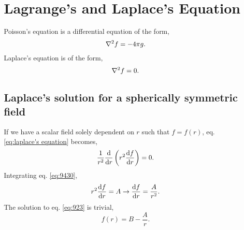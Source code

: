 \documentclass{book}
\begin{document}
\section{Lagrange's and Laplace's Equation}
Poisson's equation is a differential equation of the form,
\begin{equation}
	\laplacian{f} = -4\pi g. \label{eq:poisson's equation}
\end{equation}
Laplace's equation is of the form,
\begin{equation}
	\laplacian{f} = 0. \label{eq:laplace's equation}
\end{equation}
\subsection{Laplace's solution for a spherically symmetric field}
If we have a scalar field solely dependent on $r$ such that $f = f(r)$, eq. \eqref{eq:laplace's equation} becomes,
\begin{equation}
	\frac{1}{r^2}\dv{r}\left(r^2\dv{f}{r}\right) = 0. \label{eq:9430}
\end{equation}
Integrating eq. \eqref{eq:9430},
\begin{equation}
	r^2 \dv{f}{r} = A \to \dv{f}{r} = \frac{A}{r^2}. \label{eq:923}
\end{equation}
The solution to eq. \eqref{eq:923} is trivial,
\begin{equation}
	f(r) = B - \frac{A}{r}.
\end{equation}
\end{document}
